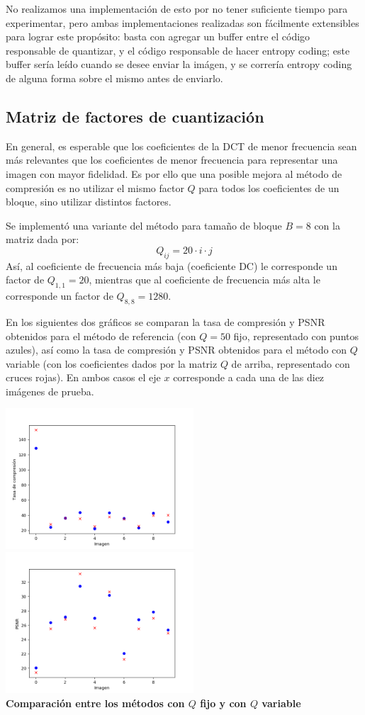 \documentclass{article}
\begin{document}
No realizamos una implementación de esto por no tener suficiente tiempo para experimentar, pero ambas implementaciones realizadas son fácilmente extensibles para lograr este propósito: basta con agregar un buffer entre el código responsable de quantizar, y el código responsable de hacer entropy coding; este buffer sería leído cuando se desee enviar la imágen, y se correría entropy coding de alguna forma sobre el mismo antes de enviarlo.

\subsection{Matriz de factores de cuantización}

En general, es esperable que los coeficientes de la DCT de menor frecuencia
sean más relevantes que los coeficientes de menor frecuencia
para representar una imagen con mayor fidelidad.
Es por ello que una posible mejora al método de compresión es no utilizar el
mismo factor $Q$ para todos los coeficientes de un bloque, sino utilizar
distintos factores.

Se implementó una variante del método para tamaño de bloque $B = 8$ con la
matriz dada por:
\[
  Q_{ij} = 20 \cdot i \cdot j
\]
Así, al coeficiente de frecuencia más baja (coeficiente DC)
le corresponde un factor de $Q_{1,1} = 20$,
mientras que al coeficiente de frecuencia más alta
le corresponde un factor de $Q_{8,8} = 1280$.
\medskip

En los siguientes dos gráficos se comparan la tasa de compresión y PSNR obtenidos
para el método de referencia (con $Q = 50$ fijo, representado con puntos azules),
así como la tasa de compresión y PSNR obtenidos
para el método con $Q$ variable (con los coeficientes dados por la matriz $Q$
de arriba, representado con cruces rojas).
En ambos casos el eje $x$ corresponde a cada una de las diez imágenes de prueba.
\begin{center}
  \includegraphics[width=7cm]{../imgs/output/qmatrix_plots/qmatrix_rate.png}
  \includegraphics[width=7cm]{../imgs/output/qmatrix_plots/qmatrix_psnr.png}\\
  {\bf Comparación entre los métodos con $Q$ fijo y con $Q$ variable}
\end{center}
\end{document}
